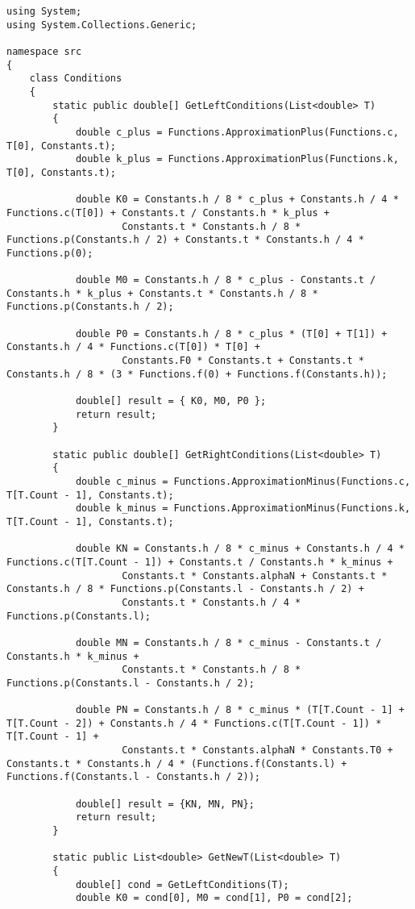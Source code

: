 \documentclass[a4paper,oneside,12pt]{extreport}
\begin{document}
\begin{lstlisting}[]
using System;
using System.Collections.Generic;

namespace src
{
	class Conditions
	{
		static public double[] GetLeftConditions(List<double> T)
		{
			double c_plus = Functions.ApproximationPlus(Functions.c, T[0], Constants.t);
			double k_plus = Functions.ApproximationPlus(Functions.k, T[0], Constants.t);

			double K0 = Constants.h / 8 * c_plus + Constants.h / 4 * Functions.c(T[0]) + Constants.t / Constants.h * k_plus + 
					Constants.t * Constants.h / 8 * Functions.p(Constants.h / 2) + Constants.t * Constants.h / 4 * Functions.p(0);

			double M0 = Constants.h / 8 * c_plus - Constants.t / Constants.h * k_plus + Constants.t * Constants.h / 8 * Functions.p(Constants.h / 2);

			double P0 = Constants.h / 8 * c_plus * (T[0] + T[1]) + Constants.h / 4 * Functions.c(T[0]) * T[0] + 
					Constants.F0 * Constants.t + Constants.t * Constants.h / 8 * (3 * Functions.f(0) + Functions.f(Constants.h));

			double[] result = { K0, M0, P0 };
			return result;
		}

		static public double[] GetRightConditions(List<double> T)
		{
			double c_minus = Functions.ApproximationMinus(Functions.c, T[T.Count - 1], Constants.t);
			double k_minus = Functions.ApproximationMinus(Functions.k, T[T.Count - 1], Constants.t);

			double KN = Constants.h / 8 * c_minus + Constants.h / 4 * Functions.c(T[T.Count - 1]) + Constants.t / Constants.h * k_minus + 
					Constants.t * Constants.alphaN + Constants.t * Constants.h / 8 * Functions.p(Constants.l - Constants.h / 2) + 
					Constants.t * Constants.h / 4 * Functions.p(Constants.l);

			double MN = Constants.h / 8 * c_minus - Constants.t / Constants.h * k_minus + 
					Constants.t * Constants.h / 8 * Functions.p(Constants.l - Constants.h / 2);

			double PN = Constants.h / 8 * c_minus * (T[T.Count - 1] + T[T.Count - 2]) + Constants.h / 4 * Functions.c(T[T.Count - 1]) * T[T.Count - 1] + 
					Constants.t * Constants.alphaN * Constants.T0 + Constants.t * Constants.h / 4 * (Functions.f(Constants.l) + Functions.f(Constants.l - Constants.h / 2));

			double[] result = {KN, MN, PN};
			return result;
		}

		static public List<double> GetNewT(List<double> T)
		{
			double[] cond = GetLeftConditions(T);
			double K0 = cond[0], M0 = cond[1], P0 = cond[2];


\end{lstlisting}
\end{document}
